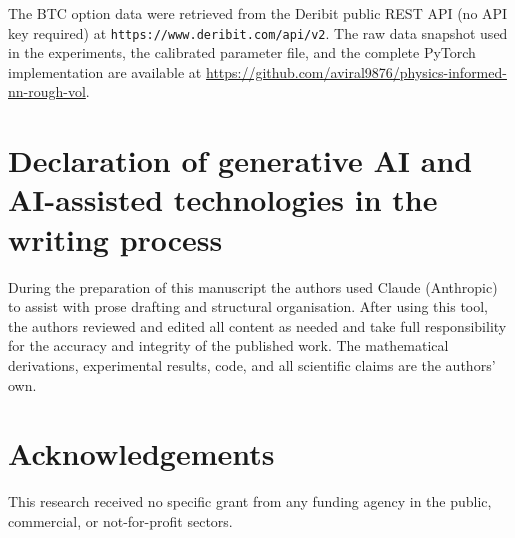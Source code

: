 \documentclass[review,12pt]{elsarticle}
\begin{document}
The BTC option data were retrieved from the Deribit public REST API
(no API key required) at \texttt{https://www.deribit.com/api/v2}.  The raw data
snapshot used in the experiments, the calibrated parameter file, and the complete
PyTorch implementation are available at
\url{https://github.com/aviral9876/physics-informed-nn-rough-vol}.

\section*{Declaration of generative AI and AI-assisted technologies in the
writing process}

During the preparation of this manuscript the authors used Claude (Anthropic)
to assist with prose drafting and structural organisation.  After using this
tool, the authors reviewed and edited all content as needed and take full
responsibility for the accuracy and integrity of the published work.  The
mathematical derivations, experimental results, code, and all scientific claims
are the authors' own.

\section*{Acknowledgements}

This research received no specific grant from any funding agency in the public,
commercial, or not-for-profit sectors.



\end{document}
